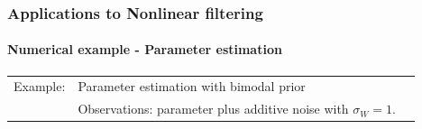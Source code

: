 \documentclass[xcolor=dvipsnames, subsection=false]{beamer}
\def\alertb#1{\alert{\color{BrickRed}  #1}}
\def\alertb#1{\alert{\color{BrickRed}  #1}}
\begin{document}
\begin{frame}
\frametitle{Applications to Nonlinear filtering}
\framesubtitle{Numerical example - Parameter estimation}
\begin{minipage}[t][6.5cm][t]{\textwidth}
	
	\begin{tabular}{lll}\alertb{Example:}   & Parameter estimation with bimodal prior 
		\\
		&   Observations:  parameter plus additive noise with $\sigma_W = 1$.
	\end{tabular}

	\centering

\end{minipage}
\end{frame}
\end{document}
